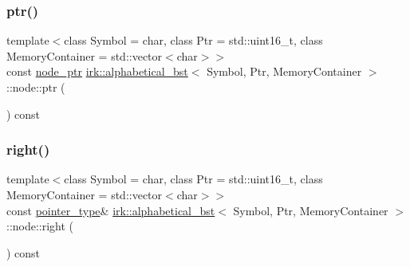 \mbox{\label{structirk_1_1alphabetical__bst_1_1node_a9ec39a805a09afaf00b9bdb21ec5cb82}} 
\subsubsection{\texorpdfstring{ptr()}{ptr()}}
{\footnotesize\ttfamily template$<$class Symbol = char, class Ptr = std\+::uint16\+\_\+t, class Memory\+Container = std\+::vector$<$char$>$$>$ \\
const \mbox{\hyperlink{structirk_1_1alphabetical__bst_1_1node__ptr}{node\+\_\+ptr}} \mbox{\hyperlink{classirk_1_1alphabetical__bst}{irk\+::alphabetical\+\_\+bst}}$<$ Symbol, Ptr, Memory\+Container $>$\+::node\+::ptr (\begin{DoxyParamCaption}{ }\end{DoxyParamCaption}) const\hspace{0.3cm}{\ttfamily [inline]}}

\mbox{\label{structirk_1_1alphabetical__bst_1_1node_a0d8c0916eb71b6d6025660674ac964dd}} 
\subsubsection{\texorpdfstring{right()}{right()}}
{\footnotesize\ttfamily template$<$class Symbol = char, class Ptr = std\+::uint16\+\_\+t, class Memory\+Container = std\+::vector$<$char$>$$>$ \\
const \mbox{\hyperlink{classirk_1_1alphabetical__bst_ae689c05ab96a71769e24908d5c73765c}{pointer\+\_\+type}}\& \mbox{\hyperlink{classirk_1_1alphabetical__bst}{irk\+::alphabetical\+\_\+bst}}$<$ Symbol, Ptr, Memory\+Container $>$\+::node\+::right (\begin{DoxyParamCaption}{ }\end{DoxyParamCaption}) const\hspace{0.3cm}{\ttfamily [inline]}}

\mbox{\label{structirk_1_1alphabetical__bst_1_1node_ad4eda9986a848303569207ecfd7c9252}} 
